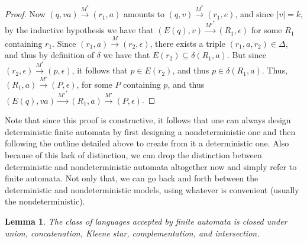 \documentclass{article}
\theoremstyle{definition}
\theoremstyle{plain}
\theoremstyle{theorem}
\newtheorem{lemma}{Lemma}[section]
\begin{document}
\begin{proof}
Now $(q,va) \overset{M^*}{\to} (r_1,a)$ amounts to $(q,v) \overset{M^*}{\to} (r_1,e)$, and since $|v|=k$, by the inductive hypothesis we have that $(E(q),v) \overset{M'^*}{\to} (R_1,\epsilon)$ for some $R_1$ containing $r_1$. Since $(r_1,a) \overset{M}{\to} (r_2, \epsilon)$, there exists a triple $(r_1,a,r_2) \in \Delta$, and thus by definition of $\delta$ we have that $E(r_2) \subseteq \delta(R_1,a)$. But since $(r_2,\epsilon) \overset{M^*}{\to} (p,\epsilon)$, it follows that $p \in E(r_2)$, and thus $p \in \delta(R_1,a)$. Thus, $(R_1,a) \overset{M'}{\to} (P,\epsilon)$, for some $P$ containing $p$, and thus $(E(q),va)\overset{M'^*}{\to} (R_1,a) \overset{M'}{\to} (P,\epsilon)$.
\end{proof}
Note that since this proof is constructive, it follows that one can always design deterministic finite automata by first designing a nondeterministic one and then following the outline detailed above to create from it a deterministic one. Also because of this lack of distinction, we can drop the distinction between deterministic and nondeterministic automata altogether now and simply refer to finite automata. Not only that, we can go back and forth between the deterministic and nondeterministic models, using whatever is convenient (usually the nondeterministic).
\begin{lemma}
	The class of languages accepted by finite automata is closed under union, concatenation, Kleene star, complementation, and intersection.
\end{lemma}
\end{document}
